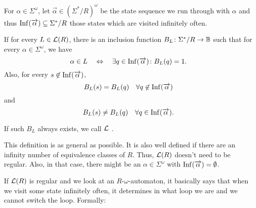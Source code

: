 \begin{mydef}
For $\alpha \in \Sigma^\omega$, let $\overrightarrow \alpha \in (\Sigma^* / R)^\omega$ be the state sequence we run through with $\alpha$ and thus $\operatorname{Inf}(\overrightarrow \alpha) \subseteq \Sigma^*/R$ those states which are visited infinitely often.

If for every $L \in \mathcal{L}(R)$, there is an inclusion function $B_L \colon \Sigma^*/R \rightarrow \mathbb{B}$ such that for every $\alpha \in \Sigma^\omega$, we have
\[ \alpha \in L \ \ \ \Leftrightarrow \ \ \ \exists q \in \operatorname{Inf}(\overrightarrow \alpha) \colon B_L(q) = 1 . \]
Also, for every $s \not\in \operatorname{Inf}(\overrightarrow \alpha)$,
\[ B_L(s) = B_L(q) \ \ \ \forall q \not\in \operatorname{Inf}(\overrightarrow \alpha) \]
and
\[ B_L(s) \neq B_L(q) \ \ \ \forall q \in \operatorname{Inf}(\overrightarrow \alpha) . \]

If such $B_L$ always exists, we call $\mathcal{L}$ .
\end{mydef}

This definition is as general as possible. It is also well defined if there are an infinity number of equivalence classes of $R$. Thus, $\mathcal{L}(R)$ doesn't need to be regular. Also, in that case, there might be an $\alpha \in \Sigma^\omega$ with $\operatorname{Inf}(\overrightarrow \alpha) = \emptyset$.

If $\mathcal{L}(R)$ is regular and we look at an $R$-$\omega$-automaton, it basically says that when we visit some state infinitely often, it determines in what loop we are and we cannot switch the loop. Formally:

